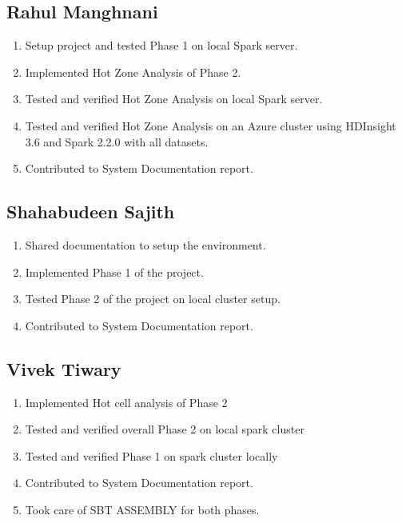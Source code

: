 \subsection{Rahul Manghnani}
\begin{enumerate}
	\item Setup project and tested Phase 1 on local Spark server.
    \item Implemented Hot Zone Analysis of Phase 2.
	\item Tested and verified Hot Zone Analysis on local Spark server.
	\item Tested and verified Hot Zone Analysis on an Azure cluster using HDInsight 3.6 and Spark 2.2.0 with all datasets.
	\item Contributed to System Documentation report.
\end{enumerate}

\subsection{Shahabudeen Sajith}
\begin{enumerate}
    \item Shared documentation to setup the environment.
    \item Implemented Phase 1 of the project.
    \item Tested Phase 2 of the project on local cluster setup.
    \item Contributed to System Documentation report.
\end{enumerate}

\subsection{Vivek Tiwary}
\begin{enumerate}
    \item Implemented Hot cell analysis of Phase 2
    \item Tested and verified overall Phase 2 on local spark cluster
    \item Tested and verified Phase 1 on spark cluster locally
    \item Contributed to System Documentation report.
    \item Took care of SBT ASSEMBLY for both phases.
\end{enumerate}

